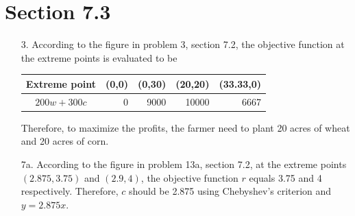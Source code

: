 \documentclass[10pt]{report}
\begin{document}
\begin{enumerate}
\end{enumerate}

\section*{Section 7.3}
\begin{enumerate}
	\item [3.]
	According to the figure in problem 3, section 7.2, the objective function at the extreme points is evaluated to be 
	\begin{table}[H]
		\centering
		\begin{tabular}{c*{4}{N}} 
			\toprule
			Extreme point & (0,0) & (0,30) & (20,20) & (33.33,0) \\ \midrule
			$200 w + 300 c$ & 0 & 9000 & 10000 & 6667 \\
			\bottomrule
		\end{tabular}
	\end{table}
	Therefore, to maximize the profits, the farmer need to plant 20 acres of wheat and 20 acres of corn.
	
	\item [7a.]
	According to the figure in problem 13a, section 7.2, at the extreme points $(2.875, 3.75)$ and $(2.9, 4)$, the objective function $r$ equals 3.75 and 4 respectively. Therefore, $c$ should be 2.875 using Chebyshev's criterion and $y=2.875x$.
\end{enumerate}
\end{document}
